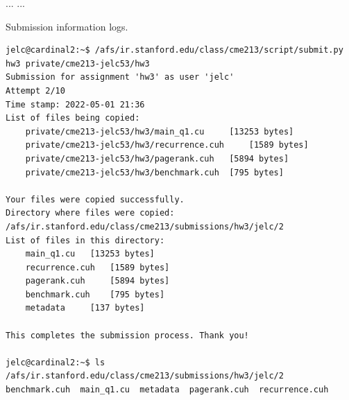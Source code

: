 \documentclass[12pt,letterpaper,twoside]{article}
\begin{document}
...
...

Submission information logs.
\begin{verbatim}
jelc@cardinal2:~$ /afs/ir.stanford.edu/class/cme213/script/submit.py hw3 private/cme213-jelc53/hw3
Submission for assignment 'hw3' as user 'jelc'
Attempt 2/10
Time stamp: 2022-05-01 21:36
List of files being copied:
    private/cme213-jelc53/hw3/main_q1.cu	 [13253 bytes]
    private/cme213-jelc53/hw3/recurrence.cuh	 [1589 bytes]
    private/cme213-jelc53/hw3/pagerank.cuh	 [5894 bytes]
    private/cme213-jelc53/hw3/benchmark.cuh	 [795 bytes]

Your files were copied successfully.
Directory where files were copied: /afs/ir.stanford.edu/class/cme213/submissions/hw3/jelc/2
List of files in this directory:
    main_q1.cu	 [13253 bytes]
    recurrence.cuh	 [1589 bytes]
    pagerank.cuh	 [5894 bytes]
    benchmark.cuh	 [795 bytes]
    metadata	 [137 bytes]

This completes the submission process. Thank you!
    
jelc@cardinal2:~$ ls /afs/ir.stanford.edu/class/cme213/submissions/hw3/jelc/2
benchmark.cuh  main_q1.cu  metadata  pagerank.cuh  recurrence.cuh
\end{verbatim}
\end{document}

